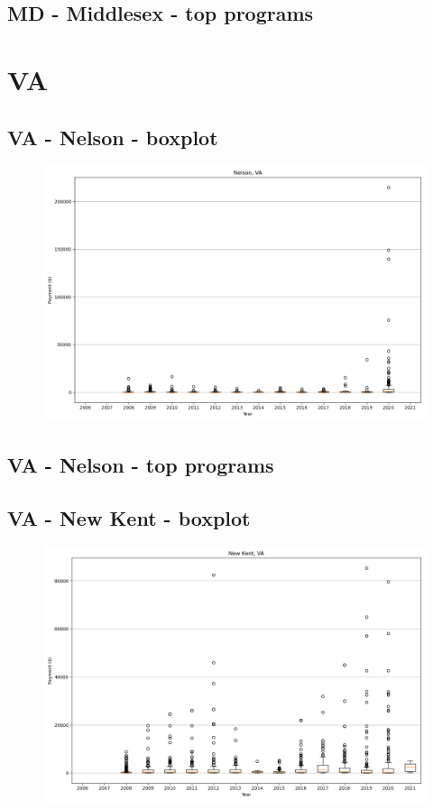 \subsection*{MD - Middlesex - top programs}

\newpage
\section*{VA}
\subsection*{VA - Nelson - boxplot}
\begin{figure}[h]
\centering
\includegraphics[width=7in]{../output/boxplots/counties/Nelson-VA_boxplot.png}
\end{figure}


\subsection*{VA - Nelson - top programs}

\newpage
\subsection*{VA - New Kent - boxplot}
\begin{figure}[h]
\centering
\includegraphics[width=7in]{../output/boxplots/counties/New Kent-VA_boxplot.png}
\end{figure}


